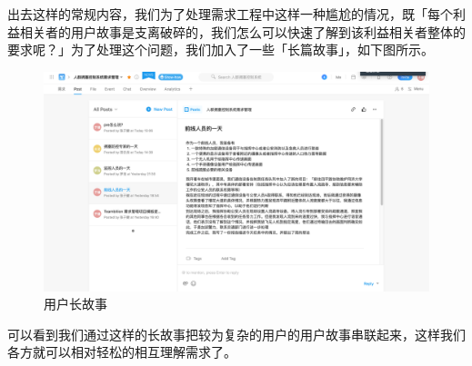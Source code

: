 \documentclass{ctexrep}
\begin{document}
出去这样的常规内容，我们为了处理需求工程中这样一种尴尬的情况，既「每个利益相关者的用户故事是支离破碎的，我们怎么可以快速了解到该利益相关者整体的要求呢？」为了处理这个问题，我们加入了一些「长篇故事」，如下图所示。
\begin{figure}[H]
	\centering
	\includegraphics[scale=0.24]{img/longStory.png}
	\caption{\label{fig:long_story} 用户长故事}
\end{figure}
可以看到我们通过这样的长故事把较为复杂的用户的用户故事串联起来，这样我们各方就可以相对轻松的相互理解需求了。
\end{document}
